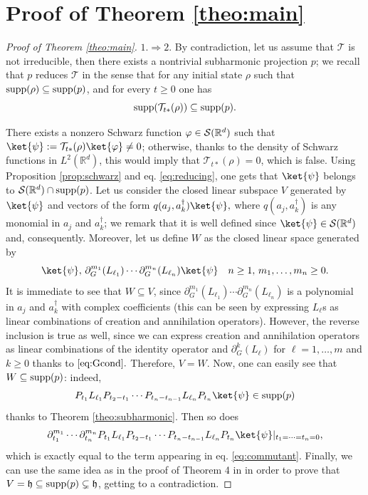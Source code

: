 \documentclass[preprint]{elsarticle}
\theoremstyle{definition}
\def\hh{\mathfrak{h} }
\def\RR{\mathbb{R}}
\def\TT{\mathcal{T}}
\def\hh{\mathfrak{h}}
\begin{document}
\section{Proof of Theorem \ref{theo:main}} \label{app:maintheo}

\begin{proof}[Proof of Theorem \ref{theo:main}]
$1. \Rightarrow 2.$ By contradiction, let us assume that $\TT$ is not irreducible, then there exists a nontrivial subharmonic projection $p$; we recall that $p$ reduces $\TT$ in the sense that for any initial state $\rho$ such that ${\rm supp}(\rho) \subseteq {\rm supp}(p)$, and for every $t \geq 0$ one has
\begin{equation} \label{eq:reducing}{\rm supp}(\TT_{t*}(\rho)) \subseteq {\rm supp}(p).\end{equation}

There exists a nonzero Schwarz function $\varphi \in {\cal S}(\RR^d)$ such that $\ket{\psi}:=\TT_{t*}(\rho)\ket{\varphi} \neq 0$; otherwise, thanks to the density of Schwarz functions in $L^2(\RR^d)$, this would imply that $\TT_{t*}(\rho)=0$, which is false. Using Proposition \ref{prop:schwarz} and eq. \eqref{eq:reducing}, one gets that $\ket{\psi}$ belongs to ${\cal S}(\RR^d)\cap {\rm supp}(p)$. Let us consider the closed linear subspace $V$ generated by $\ket{\psi}$ and vectors of the form $q(a_j,a_k^\dagger) \ket{\psi},$ where $q(a_j,a_k^\dagger)$ is any monomial in $a_j$ and $a_k^\dagger$; we remark that it is well defined since $\ket{\psi} \in {\cal S}(\RR^d)$ and, consequently. Moreover, let us define $W$ as the closed linear space generated by 
\begin{equation} \label{eq:commutant}\ket{\psi}, \, \partial_G^{m_1}(L_{\ell_1}) \cdots \partial_G^{m_n}(L_{\ell_n})\ket{\psi} \quad n\geq 1,\, m_1, \dots, m_n \geq 0.
\end{equation}
It is immediate to see that $W \subseteq V$, since $\partial_G^{m_1}(L_{\ell_1}) \cdots \partial_G^{m_n}(L_{\ell_n})$ is a polynomial in $a_j$ and $a_k^\dagger$ with complex coefficients (this can be seen by expressing $L_\ell$s as linear combinations of creation and annihilation operators). However, the reverse inclusion is true as well, since we can express creation and annihilation operators as linear combinations of the identity operator and $\partial_G^{k}(L_\ell)$ for $\ell=1,\dots, m$ and $k \geq 0$ thanks to $\eqref{eq:Gcond}.$ Therefore, $V=W$. Now, one can easily see that $W \subseteq {\rm supp}(p)$: indeed,
$$P_{t_1}L_{\ell_1}P_{t_2-t_1}\cdots P_{t_{n}-t_{n-1}}L_{\ell_n}P_{t_n}\ket{\psi} \in {\rm supp}(p)$$
thanks to Theorem \ref{theo:subharmonic}. Then so does
$$\partial^{m_1}_{t_1}\cdots \partial_{t_n}^{m_n}P_{t_1}L_{\ell_1}P_{t_2-t_1}\cdots P_{t_{n}-t_{n-1}}L_{\ell_n}P_{t_n}\ket{\psi}|_{t_1=\cdots =t_n=0},$$
which is exactly equal to the term appearing in eq. \eqref{eq:commutant}. Finally, we can use the same idea as in the proof of Theorem 4 in \cite{AFP22b} in order to prove that $V=\hh\subseteq {\rm supp}(p) \subsetneq\hh$, getting to a contradiction.


\end{proof}
\end{document}
